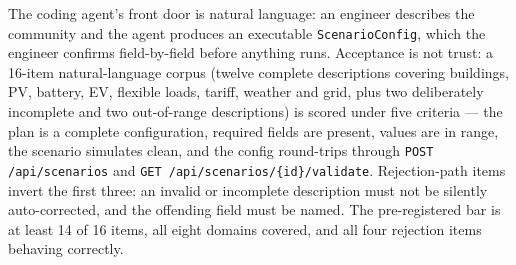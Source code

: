\documentclass[11pt,a4paper]{article}
\begin{document}
The coding agent's front door is natural language: an engineer describes the
community and the agent produces an executable \texttt{ScenarioConfig}, which
the engineer confirms field-by-field before anything runs. Acceptance is not
trust: a 16-item natural-language corpus (twelve complete descriptions
covering buildings, PV, battery, EV, flexible loads, tariff, weather and grid,
plus two deliberately incomplete and two out-of-range descriptions) is scored
under five criteria --- the plan is a complete configuration, required fields
are present, values are in range, the scenario simulates clean, and the config
round-trips through \texttt{POST /api/scenarios} and
\texttt{GET /api/scenarios/\{id\}/validate}. Rejection-path items invert the
first three: an invalid or incomplete description must not be silently
auto-corrected, and the offending field must be named. The pre-registered bar
is at least 14 of 16 items, all eight domains covered, and all four rejection
items behaving correctly.
\end{document}

